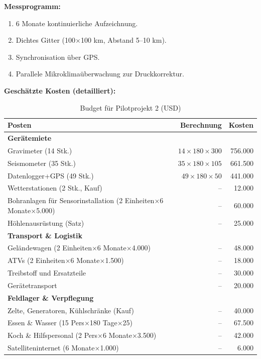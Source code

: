 \documentclass[12pt,a4paper]{article}
\theoremstyle{remark}
\begin{document}
	\textbf{Messprogramm:}
	\begin{enumerate}
		\item 6 Monate kontinuierliche Aufzeichnung.
		\item Dichtes Gitter (100$\times$100 km, Abstand 5–10 km).
		\item Synchronisation über GPS.
		\item Parallele Mikroklimaüberwachung zur Druckkorrektur.
	\end{enumerate}
	
	\textbf{Geschätzte Kosten (detailliert):}
	\begin{table}[htbp]
		\centering
		\caption{Budget für Pilotprojekt 2 (USD)}
		\label{tab:budget-karst}
		\small
		\begin{tabular}{lrr}
			\toprule
			\textbf{Posten} & \textbf{Berechnung} & \textbf{Kosten} \\
			\midrule
			\multicolumn{3}{l}{\textbf{Gerätemiete}} \\
			Gravimeter (14 Stk.) & $14\times180\times300$ & 756.000 \\
			Seismometer (35 Stk.) & $35\times180\times105$ & 661.500 \\
			Datenlogger+GPS (49 Stk.) & $49\times180\times50$ & 441.000 \\
			Wetterstationen (2 Stk., Kauf) & – & 12.000 \\
			Bohranlagen für Sensorinstallation (2 Einheiten$\times$6 Monate$\times$5.000) & – & 60.000 \\
			Höhlenausrüstung (Satz) & – & 25.000 \\
			\multicolumn{3}{l}{\textbf{Transport \& Logistik}} \\
			Geländewagen (2 Einheiten$\times$6 Monate$\times$4.000) & – & 48.000 \\
			ATVs (2 Einheiten$\times$6 Monate$\times$1.500) & – & 18.000 \\
			Treibstoff und Ersatzteile & – & 30.000 \\
			Gerätetransport & – & 20.000 \\
			\multicolumn{3}{l}{\textbf{Feldlager \& Verpflegung}} \\
			Zelte, Generatoren, Kühlschränke (Kauf) & – & 40.000 \\
			Essen \& Wasser (15 Pers$\times$180 Tage$\times$25) & – & 67.500 \\
			Koch \& Hilfspersonal (2 Pers$\times$6 Monate$\times$3.500) & – & 42.000 \\
			Satelliteninternet (6 Monate$\times$1.000) & – & 6.000 \\

\end{tabular}
\end{table}
\end{document}
